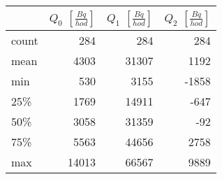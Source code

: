 \begin{tabular}{lrrr}
\toprule
{} &  $Q_0$ $\left[\si{\frac{Bq}{hod}}\right]$ &  $Q_1$ $\left[\si{\frac{Bq}{hod}}\right]$ &  $Q_2$ $\left[\si{\frac{Bq}{hod}}\right]$ \\
\midrule
count &                                       284 &                                       284 &                                       284 \\
mean  &                                      4303 &                                     31307 &                                      1192 \\
min   &                                       530 &                                      3155 &                                     -1858 \\
25\%   &                                      1769 &                                     14911 &                                      -647 \\
50\%   &                                      3058 &                                     31359 &                                       -92 \\
75\%   &                                      5563 &                                     44656 &                                      2758 \\
max   &                                     14013 &                                     66567 &                                      9889 \\
\bottomrule
\end{tabular}
